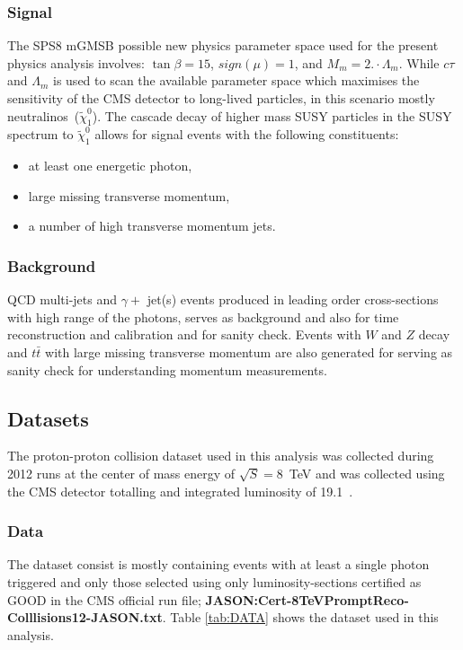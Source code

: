 \subsubsection*{Signal}
The SPS8 mGMSB possible new physics parameter space used for the present physics analysis involves: $\tan\beta = 15$, $sign(\mu) = 1$, and $M_{m} = 2.\cdot \Lambda_{m}$. While $c\tau$ and $\Lambda_{m}$ is used to scan the available parameter space which maximises the sensitivity of the CMS detector to long-lived particles, in this scenario mostly neutralinos~($\tilde{\chi}^{0}_{1}$). The cascade decay of higher mass SUSY particles in the SUSY spectrum to $\tilde{\chi}^{0}_{1}$ allows for signal events with the following constituents:
\begin{itemize}
\item at least one energetic photon,
\item large missing transverse momentum,
\item a number of high transverse momentum jets.
\end{itemize}
\subsubsection*{Background}
QCD multi-jets and $\gamma +$ jet(s) events produced in leading order cross-sections with high \pt range of the photons, serves as background and also for time reconstruction and calibration and for sanity check. Events with $W$  and $Z$ decay  and $t\bar{t}$ with large missing transverse momentum are also generated for serving as sanity check for understanding momentum measurements.
\subsection{Datasets}
The proton-proton collision dataset used in this analysis was collected during 2012 runs at the center of mass energy of  $\sqrt{S} = 8$~TeV  and was collected using the CMS detector totalling and integrated luminosity of 19.1~\fbinv .
\subsubsection*{Data}
The dataset consist is mostly containing events with at least a single photon triggered and only those selected using only luminosity-sections certified as GOOD in the CMS official run file; \textbf{JASON:Cert-8TeVPromptReco-Colllisions12-JASON.txt}. Table \ref{tab:DATA} shows the dataset used in this analysis.

